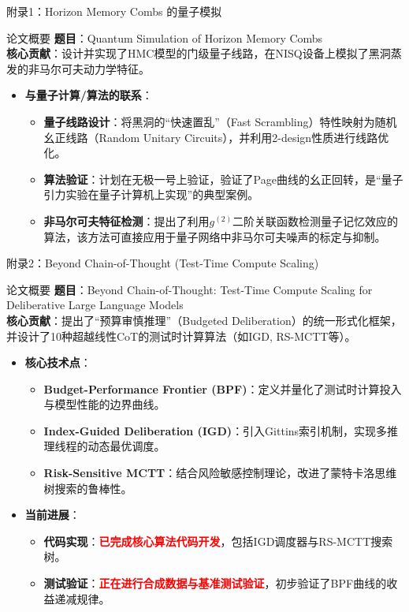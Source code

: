 \documentclass[aspectratio=169]{beamer} %
\begin{document}
\begin{frame}{附录1：Horizon Memory Combs 的量子模拟}
    \begin{block}{论文概要}
        \textbf{题目}：Quantum Simulation of Horizon Memory Combs \\
        \textbf{核心贡献}：设计并实现了HMC模型的门级量子线路，在NISQ设备上模拟了黑洞蒸发的非马尔可夫动力学特征。
    \end{block}
    \begin{itemize}
        \item \textbf{与量子计算/算法的联系}：
        \begin{itemize}
            \item \textbf{量子线路设计}：将黑洞的“快速置乱”（Fast Scrambling）特性映射为随机幺正线路（Random Unitary Circuits），并利用2-design性质进行线路优化。
            \item \textbf{算法验证}：计划在无极一号上验证，验证了Page曲线的幺正回转，是“量子引力实验在量子计算机上实现”的典型案例。
            \item \textbf{非马尔可夫特征检测}：提出了利用$g^{(2)}$二阶关联函数检测量子记忆效应的算法，该方法可直接应用于量子网络中非马尔可夫噪声的标定与抑制。
        \end{itemize}
    \end{itemize}
\end{frame}

\begin{frame}{附录2：Beyond Chain-of-Thought (Test-Time Compute Scaling)}
    \begin{block}{论文概要}
        \textbf{题目}：Beyond Chain-of-Thought: Test-Time Compute Scaling for Deliberative Large Language Models \\
        \textbf{核心贡献}：提出了“预算审慎推理”（Budgeted Deliberation）的统一形式化框架，并设计了10种超越线性CoT的测试时计算算法（如IGD, RS-MCTT等）。
    \end{block}
    \begin{itemize}
        \item \textbf{核心技术点}：
        \begin{itemize}
            \item \textbf{Budget-Performance Frontier (BPF)}：定义并量化了测试时计算投入与模型性能的边界曲线。
            \item \textbf{Index-Guided Deliberation (IGD)}：引入Gittins索引机制，实现多推理线程的动态最优调度。
            \item \textbf{Risk-Sensitive MCTT}：结合风险敏感控制理论，改进了蒙特卡洛思维树搜索的鲁棒性。
        \end{itemize}
        \item \textbf{当前进展}：
        \begin{itemize}
            \item \textbf{代码实现}：\textcolor{red}{\textbf{已完成核心算法代码开发}}，包括IGD调度器与RS-MCTT搜索树。
            \item \textbf{测试验证}：\textcolor{red}{\textbf{正在进行合成数据与基准测试验证}}，初步验证了BPF曲线的收益递减规律。
        \end{itemize}
    \end{itemize}
\end{frame}
\end{document}
